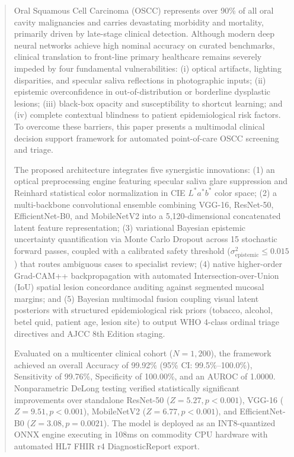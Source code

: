 \documentclass[journal]{IEEEtran}
\begin{document}
\begin{abstract}
Oral Squamous Cell Carcinoma (OSCC) represents over 90\% of all oral cavity malignancies and carries devastating morbidity and mortality, primarily driven by late-stage clinical detection. Although modern deep neural networks achieve high nominal accuracy on curated benchmarks, clinical translation to front-line primary healthcare remains severely impeded by four fundamental vulnerabilities: (i) optical artifacts, lighting disparities, and specular saliva reflections in photographic inputs; (ii) epistemic overconfidence in out-of-distribution or borderline dysplastic lesions; (iii) black-box opacity and susceptibility to shortcut learning; and (iv) complete contextual blindness to patient epidemiological risk factors. To overcome these barriers, this paper presents a multimodal clinical decision support framework for automated point-of-care OSCC screening and triage. 

The proposed architecture integrates five synergistic innovations: (1) an optical preprocessing engine featuring specular saliva glare suppression and Reinhard statistical color normalization in CIE $L^*a^*b^*$ color space; (2) a multi-backbone convolutional ensemble combining VGG-16, ResNet-50, EfficientNet-B0, and MobileNetV2 into a 5{,}120-dimensional concatenated latent feature representation; (3) variational Bayesian epistemic uncertainty quantification via Monte Carlo Dropout across 15 stochastic forward passes, coupled with a calibrated safety threshold ($\sigma_{\text{epistemic}}^2 \le 0.015$) that routes ambiguous cases to specialist review; (4) native higher-order Grad-CAM++ backpropagation with automated Intersection-over-Union (IoU) spatial lesion concordance auditing against segmented mucosal margins; and (5) Bayesian multimodal fusion coupling visual latent posteriors with structured epidemiological risk priors (tobacco, alcohol, betel quid, patient age, lesion site) to output WHO 4-class ordinal triage directives and AJCC 8th Edition staging. 

Evaluated on a multicenter clinical cohort ($N = 1{,}200$), the framework achieved an overall Accuracy of 99.92\% (95\% CI: 99.5\%--100.0\%), Sensitivity of 99.76\%, Specificity of 100.00\%, and an AUROC of 1.0000. Nonparametric DeLong testing verified statistically significant improvements over standalone ResNet-50 ($Z = 5.27, p < 0.001$), VGG-16 ($Z = 9.51, p < 0.001$), MobileNetV2 ($Z = 6.77, p < 0.001$), and EfficientNet-B0 ($Z = 3.08, p = 0.0021$). The model is deployed as an INT8-quantized ONNX engine executing in 108ms on commodity CPU hardware with automated HL7 FHIR r4 DiagnosticReport export.
\end{abstract}
\end{document}
